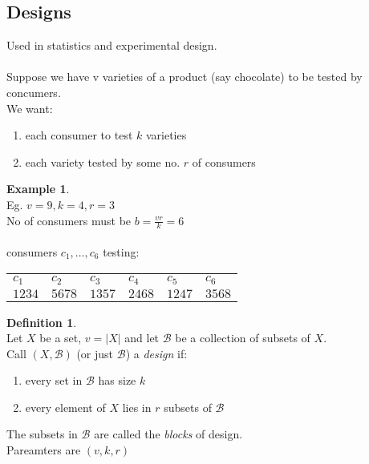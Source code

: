 \documentclass[]{article}
\theoremstyle{definition}
\newtheorem*{defn}{Definition}
\newtheorem*{exmp}{Example}
\theoremstyle{remark}
\numberwithin{equation}{section}
\begin{document}
	\subsection{Designs}
		Used in statistics and experimental design.\\
		\\
		Suppose we have v varieties of a product (say chocolate) to be tested by concumers.\\
		We want:\\
		\begin{enumerate}
			\item each consumer to test $k$ varieties
			\item each variety tested by some no. $r$ of consumers
		\end{enumerate}

		\begin{exmp}\hfill\\
			Eg. $v =9, k = 4, r =3$\\
			No of consumers must be $b = \frac{vr}{k} = 6$\\
			\\
			consumers $c_1, …, c_6$ testing:\\
			\begin{table}[h]
				\begin{tabular}{llllll}
				$c_1$  & $c_2$  & $c_3$  & $c_4$  & $c_5$  & $c_6$ \\
				$1234$ & $5678$ & $1357$ & $2468$ & $1247$ & $3568$ \\
				\end{tabular}
			\end{table}
		\end{exmp}
		\begin{defn}\hfill\\
		Let $X$ be a set, $v = |X|$ and let $\mathscr{B}$ be a collection of subsets of $X$.\\
		Call $(X, \mathscr{B})$ (or just $\mathscr{B}$) a \emph{design} if:\\
		\begin{enumerate}
			\item every set in $\mathscr{B}$ has size $k$
			\item every element of $X$ lies in $r$ subsets of $\mathscr{B}$
		\end{enumerate}
		\end{defn}
		The subsets in $\mathscr{B}$ are called the \emph{blocks} of design.\\
		Pareamters are $(v,k,r)$\\
\end{document}
